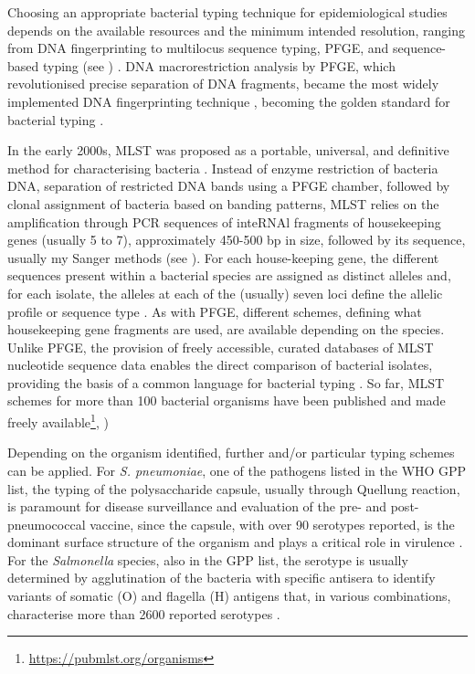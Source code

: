 Choosing an appropriate bacterial typing technique for epidemiological studies depends on the available resources and the minimum intended resolution, ranging from \ac{DNA} fingerprinting to multilocus sequence typing, \ac{PFGE}, and sequence-based typing (see ) \citep{allerberger_molecular_2012,foxman_choosing_2005}. 
\ac{DNA} macrorestriction analysis by \ac{PFGE}, which revolutionised precise separation of \ac{DNA} fragments, became the most widely implemented \ac{DNA} fingerprinting technique \citep{allerberger_molecular_2012}, becoming the golden standard for bacterial typing \citep{neoh_pulsed-field_2019}.

In the early 2000s, \ac{MLST} was proposed as a portable, universal, and definitive method for characterising bacteria \citep{maiden_multilocus_2006}. 
Instead of enzyme restriction of bacteria \ac{DNA}, separation of restricted \ac{DNA} bands using a \ac{PFGE} chamber, followed by clonal assignment of bacteria based on banding patterns, \ac{MLST} relies on the amplification through \ac{PCR} sequences of inte\ac{RNA}l fragments of housekeeping genes (usually 5 to 7), approximately 450-500 \ac{bp} in size, followed by its sequence, usually my Sanger methods (see ). 
For each house-keeping gene, the different sequences present within a bacterial species are assigned as distinct alleles and, for each isolate, the alleles at each of the (usually) seven loci define the allelic profile or sequence type \citep{larsen_multilocus_2012}. 
As with \ac{PFGE}, different schemes, defining what housekeeping gene fragments are used, are available depending on the species. 
Unlike \ac{PFGE}, the provision of freely accessible, curated databases of \ac{MLST} nucleotide sequence data enables the direct comparison of bacterial isolates, providing the basis of a common language for bacterial typing \citep{maiden_multilocus_2006}. 
So far, \ac{MLST} schemes for more than 100 bacterial organisms have been published and made freely available\footnote{\url{https://pubmlst.org/organisms}}, \cite{jolley_open-access_2018}) 

Depending on the organism identified, further and/or particular typing schemes can be applied. 
For \textit{S. pneumoniae}, one of the pathogens listed in the \ac{WHO} \ac{GPP} list, the typing of the polysaccharide capsule, usually through Quellung reaction, is paramount for disease surveillance and evaluation of the pre- and post-pneumococcal vaccine, since the capsule, with over 90 serotypes reported, is the dominant surface structure of the organism and plays a critical role in virulence \citep{jauneikaite_current_2015, paton_streptococcus_2019}. 
For the \textit{Salmonella} species, also in the \ac{GPP} list, the serotype is usually determined by agglutination of the bacteria with specific antisera to identify variants of somatic (O) and flagella (H) antigens that, in various combinations, characterise more than 2600 reported serotypes \citep{diep_salmonella_2019}. 

